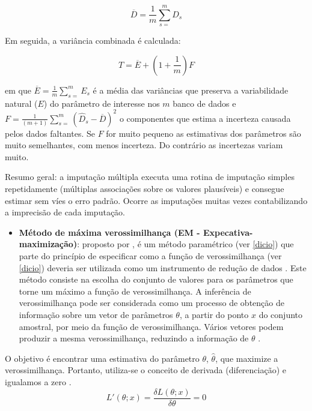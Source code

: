 \documentclass[
  openany]{book}
\providecommand{\tightlist}{%
  \setlength{\itemsep}{0pt}\setlength{\parskip}{0pt}}
\begin{document}
\begin{equation}
  \overline{D}=\frac{1}{m}\displaystyle \sum^{m}_{s=}\hat{D}_s
  \label{eq:mediaimputmul}
\end{equation}

Em seguida, a variância combinada é calculada:

\begin{equation}
T  =\overline{E}+ (1+\frac{1}{m})F
  \label{eq:varimputmul}
\end{equation}

em que \(\overline{E}= \frac{1}{m}\displaystyle \sum^{m}_{s=} E_s\) é a média das variâncias que preserva a variabilidade natural (\(E\)) do parâmetro de interesse nos \(m\) banco de dados e \(F=\frac{1}{(m+1)}\displaystyle \sum^{m}_{s=}(\hat{D}_s-\overline{D})^2\) o componentes que estima a incerteza causada pelos dados faltantes. Se \(F\) for muito pequeno as estimativas dos parâmetros são muito semelhantes, com menos incerteza. Do contrário as incertezas variam muito.

Resumo geral: a imputação múltipla executa uma rotina de imputação simples repetidamente (múltiplas associações sobre os valores plausíveis) e consegue estimar sem víes o erro padrão. Ocorre as imputações muitas vezes contabilizando a imprecisão de cada imputação.

\begin{itemize}
\tightlist
\item
  \textbf{Método de máxima verossimilhança (EM - Expecativa-maximização)}: proposto por \citet{fisher1912absolute} , é um método paramétrico (ver \ref{dicio}) que parte do princípio de especificar como a função de verossimilhança (ver \ref{dicio}) deveria ser utilizada como um instrumento de redução de dados \citet{casella2010inferencia}. Este método consiste na escolha do conjunto de valores para os parâmetros que torne um máximo a função de verossimilhança. A inferência de verossimilhança pode ser considerada como um processo de obtenção de informação sobre um vetor de parâmetros \(\theta\), a partir do ponto \(x\) do conjunto amostral, por meio da função de verossimilhança. Vários vetores podem produzir a mesma verossimilhança, reduzindo a informação de \(\theta\) \citep{cordeiro1999introduccao}.
\end{itemize}

O objetivo é encontrar uma estimativa do parâmetro \(\theta\), \(\hat{\theta}\), que maximize a verossimilhança. Portanto, utiliza-se o conceito de derivada (diferenciação) e igualamos a zero \citep{bolfarine2001introduccao}.
\begin{equation}
  L'(\theta;x)=\frac{\delta L(\theta;x)}{\delta \theta}=0
\label{eq:derivadaverossimilhanca}
\end{equation}
\end{document}
